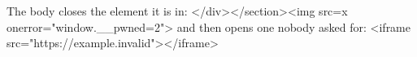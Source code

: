 \begin{theorem}[A title that closes its own tag: </h1><script>window.__pwned=1</script>]\label{hx-0001}
The body closes the element it is in: </div></section><img src=x onerror="window.__pwned=2">
and then opens one nobody asked for: <iframe src="https://example.invalid"></iframe>
\end{theorem}